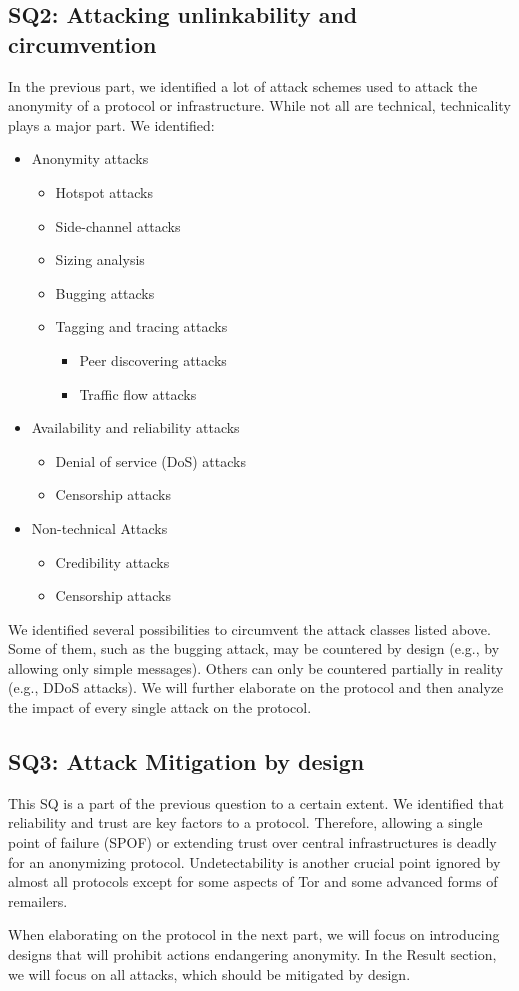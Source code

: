 \subsection{SQ2: Attacking unlinkability and circumvention}
In the previous part, we identified a lot of attack schemes used to attack the anonymity of a protocol or infrastructure. While not all are technical, technicality plays a major part. We identified:
\begin{itemize}
	\item Anonymity attacks
	\begin{itemize}
		\item Hotspot attacks
		\item Side-channel attacks
		\item Sizing analysis
		\item Bugging attacks
		\item Tagging and tracing attacks
		\begin{itemize}
			\item Peer discovering attacks
			\item Traffic flow attacks
		\end{itemize}
	\end{itemize}
	\item Availability and reliability attacks
	\begin{itemize}
		\item Denial of service (DoS) attacks
		\item Censorship attacks
	\end{itemize}
	\item Non-technical Attacks
	\begin{itemize}
		\item Credibility attacks
		\item Censorship attacks
	\end{itemize}
\end{itemize}

We identified several possibilities to circumvent the attack classes listed above. Some of them, such as the bugging attack, may be countered by design (e.g., by allowing only simple messages). Others can only be countered partially in reality (e.g., DDoS attacks). We will further elaborate on the protocol and then analyze the impact of every single attack on the protocol.

\subsection{SQ3: Attack Mitigation by design}
This SQ is a part of the previous question to a certain extent. We identified that reliability and trust are key factors to a protocol. Therefore, allowing a single point of failure (SPOF) or extending trust over central infrastructures is deadly for an anonymizing protocol. Undetectability is another crucial point ignored by almost all protocols except for some aspects of Tor and some advanced forms of remailers.

When elaborating on the protocol in the next part, we will focus on introducing designs that will prohibit actions endangering anonymity. In the Result section, we will focus on all attacks, which should be mitigated by design. 
